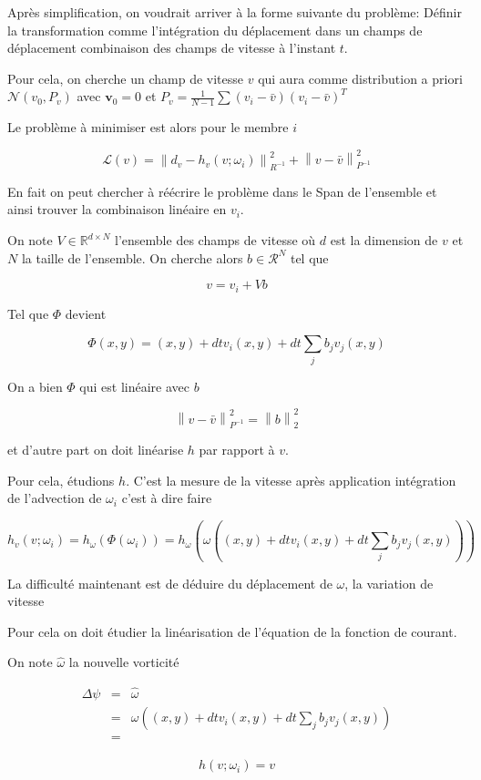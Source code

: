 \documentclass{article}
\newcommand{\bv}{\bm{v}}
\newcommand{\norm}[1]{\left\lVert #1 \right\rVert}
\begin{document}
Après simplification, on voudrait arriver à la forme suivante du problème: Définir la transformation comme l'intégration du déplacement dans un champs de déplacement combinaison des champs de vitesse à l'instant $t$.

Pour cela, on cherche un champ de vitesse $v$ qui aura comme distribution a priori $\mathcal N (v_0,  P_v)$ avec $\bv_0 = 0$ et $P_v = \frac{1}{N - 1}\sum (v_i - \bar v) (v_i - \bar v)^T$

Le problème à minimiser est alors pour le membre $i$

\begin{equation*}
    \mathcal L(v) = \norm{d_v - h_v(v; \omega_i)}^2_{R^{-1}} + \norm{v - \bar v}^2_{P^{-1}}
\end{equation*}

En fait on peut chercher à réécrire le problème dans le Span de l'ensemble et ainsi trouver la combinaison linéaire en $v_i$.


On note $V \in \mathbb R^{d \times N}$ l'ensemble des champs de vitesse où $d$ est la dimension de $v$ et $N$ la taille de l'ensemble. On cherche alors $b \in \mathcal R^{N}$ tel que

\begin{equation*}
    v = v_i + Vb
\end{equation*}

Tel que $\Phi$ devient

\begin{equation*}
    \Phi(x, y) = (x, y) + dt v_i(x, y) + dt \sum_j b_j v_j(x, y)
\end{equation*}

On a bien $\Phi$ qui est linéaire avec $b$

\begin{equation*}
    \norm{v - \bar v}^2_{P^{-1}} = \norm{b}^2_2
\end{equation*}

et d'autre part on doit linéarise $h$ par rapport à $v$.

Pour cela,  étudions $h$. C'est la mesure de la vitesse après application intégration de l'advection de $\omega_i$ c'est à dire faire

\begin{equation*}
    h_v(v; \omega_i) = h_\omega(\Phi(\omega_i)) = h_{\omega}(\omega((x, y)+ dt v_i(x, y) + dt \sum_j b_j v_j(x, y)))
\end{equation*}

La difficulté maintenant est de déduire du déplacement de $\omega$, la variation de vitesse

Pour cela on doit étudier la linéarisation de l'équation de la fonction de courant.

On note $\hat \omega$ la nouvelle vorticité

\begin{eqnarray*}
    \Delta \psi  &=& \hat \omega \\
    &=& \omega((x, y)+ dt v_i(x, y) + dt \sum_j b_j v_j(x, y)) \\
    &=&
\end{eqnarray*}


\begin{eqnarray*}
    h(v; \omega_i) = v
\end{eqnarray*}
\end{document}
